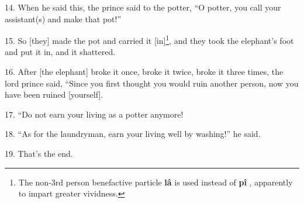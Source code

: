 14. When he said this, the prince said to the potter, ``O potter, you call your
assistant(s) and make that pot!''

15. So [they] made the pot and carried it [in]\footnote{The non-3rd person benefactive particle \textbf{lâ} is used instead of \textbf{pî} , apparently to impart greater vividness.}, and they took the elephant's
foot and put it in, and it shattered.

16. After [the elephant] broke it once, broke it twice, broke it three times, the
lord prince said, ``Since you first thought you would ruin another person, now
you have been ruined [yourself].

17. ``Do not earn your living as a potter anymore!

18. ``As for the laundryman, earn your living well by washing!'' he said.

19. That's the end.

